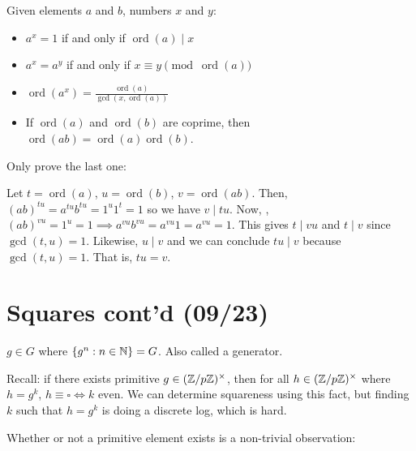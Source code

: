 \documentclass[notes]{agony}
\newcommand{\ord}{\operatorname{ord}}
\begin{document}
\begin{lemma}
    Given elements $a$ and $b$, numbers $x$ and $y$:
    \begin{itemize}[nosep]
        \item $a^x = 1$ if and only if $\ord(a) \mid x$
        \item $a^x = a^y$ if and only if $x \equiv y \pmod{\ord(a)}$
        \item $\ord(a^x) = \frac{\ord(a)}{\gcd(x,\ord(a))}$
        \item If $\ord(a)$ and $\ord(b)$ are coprime,
              then $\ord(ab) = \ord(a)\ord(b)$.
    \end{itemize}
\end{lemma}
\begin{prf}
    Only prove the last one:

    Let $t=\ord(a)$, $u=\ord(b)$, $v=\ord(ab)$.
    Then, $(ab)^{tu} = a^{tu}b^{tu} = 1^u 1^t = 1$ so we have $v \mid tu$.
    Now, \Wlog, $(ab)^{vu} = 1^u = 1 \implies a^{vu}b^{vu} = a^{vu}1 = a^{vu} = 1$.
    This gives $t \mid vu$ and $t \mid v$ since $\gcd(t,u)=1$.
    Likewise, $u \mid v$ and we can conclude $tu \mid v$ because $\gcd(t,u)=1$.
    That is, $tu = v$.
\end{prf}


\section{Squares cont'd (09/23)}

\begin{defn}
    $g \in G$ where $\{g^n : n \in \mathbb{N}\} = G$.
    Also called a generator.
\end{defn}

Recall: if there exists primitive $g \in (\mathbb{Z}/p\mathbb{Z})^\times$,
then for all $h \in (\mathbb{Z}/p\mathbb{Z})^\times$ where $h=g^k$,
$h \equiv \square \iff \text{$k$ even}$.
We can determine squareness using this fact,
but finding $k$ such that $h = g^k$ is doing a discrete log, which is hard.

Whether or not a primitive element exists is a non-trivial observation:
\end{document}
